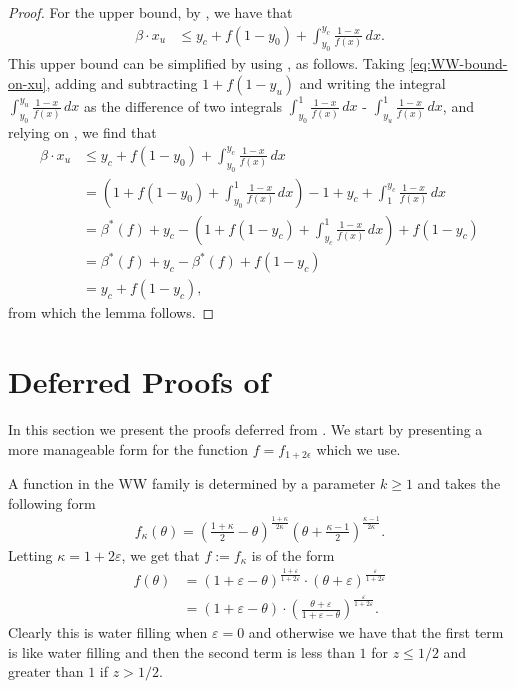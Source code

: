 \begin{proof}
	For the upper bound, by 
	\cite[Invariant 1]{wang2015two}, we have that 
	\begin{align}\label{eq:WW-bound-on-xu}
	\beta \cdot x_u & \leq y_{c} + f(1 - y_{0})  + \int_{y_{0}}^{y_{c}} \frac{1-x}{f(x)}\, dx.
	\end{align}
	This upper bound can be simplified by using , as follows.
	Taking \eqref{eq:WW-bound-on-xu}, adding and subtracting $1 + f(1-y_u)$ and writing the integral $\int_{y_0}^{y_u} \frac{1-x}{f(x)}\, dx$ as the difference of two integrals  $\int_{y_0}^{1} \frac{1-x}{f(x)}\, dx$ - $\int_{y_u}^{1} \frac{1-x}{f(x)}\, dx$, and relying on , we find that
	\begin{align*}
	\beta \cdot x_u & \leq y_{c} + f(1 - y_{0})  + \int_{y_{0}}^{y_{c}} \frac{1-x}{f(x)}\, dx \\
	&=  
	\left( 1 + f(1 - y_{0})  + \int_{y_{0}}^{1} \frac{1-x}{f(x)}\, dx \right)  -1  + y_{c} +
	\int_{1}^{y_{c}} \frac{1-x}{f(x)}\, dx \\
	&= \beta^*(f) + y_{c} - \left(  1 + f(1 - y_{c})  + \int_{y_{c}}^{1} \frac{1-x}{f(x)}\, dx  \right) + f(1-y_{c}) \\
	&= \beta^*{(f)} + y_{c} - \beta^*(f) + f(1-y_{c})\\
	& = y_{c} + f(1-y_{c}),
	\end{align*}
	from which the lemma follows.
\end{proof}

\section{Deferred Proofs of }\label{app:WW-functions}

In this section we present the proofs deferred from . We start by presenting a more manageable form for the function $f=f_{1+2\epsilon}$ which we use. 

A function in the WW family is determined by a parameter $k\geq 1$ and takes the following form
\begin{align*}
f_\kappa(\theta) = \left(\frac{1+\kappa}{2} - \theta\right)^{\frac{1+\kappa}{2\kappa}}\left(\theta+\frac{\kappa-1}{2}\right)^{\frac{\kappa-1}{2\kappa}}.
\end{align*}
Letting $\kappa= 1+2\varepsilon$, we get that $f:=f_\kappa$ is of the form
\begin{align*}
f(\theta) & = (1+\varepsilon - \theta)^{\frac{1+\varepsilon}{1+2\varepsilon}}\cdot \left(\theta + \varepsilon\right)^{\frac{\varepsilon}{1+2\varepsilon}} \\
&= \left(1+ \varepsilon - \theta\right) \cdot \left(
\frac{\theta+\varepsilon}{1+\varepsilon-\theta}
\right)^{\frac{\varepsilon}{1+2\varepsilon}}.
\end{align*}
Clearly this is water filling when $\varepsilon = 0$ and otherwise we have that the first term is like water filling and then the second term is less than $1$ for $z\leq 1/2$ and greater than $1$ if $z > 1/2$.

